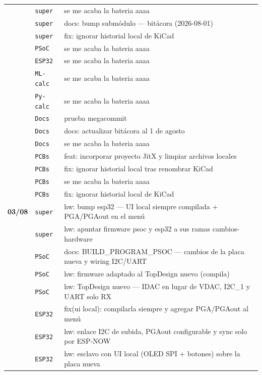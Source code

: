 \begin{longtable}{@{}p{1.7cm} p{1.5cm} p{12.2cm}@{}}
 & \texttt{\scriptsize super} & se me acaba la bateria aaaa \\
 & \texttt{\scriptsize super} & docs: bump submódulo --- bitácora (2026-08-01) \\
 & \texttt{\scriptsize super} & fix: ignorar historial local de KiCad \\
 & \texttt{\scriptsize PSoC} & se me acaba la bateria aaaa \\
 & \texttt{\scriptsize ESP32} & se me acaba la bateria aaaa \\
 & \texttt{\scriptsize ML-calc} & se me acaba la bateria aaaa \\
 & \texttt{\scriptsize Py-calc} & se me acaba la bateria aaaa \\
 & \texttt{\scriptsize Docs} & prueba megacommit \\
 & \texttt{\scriptsize Docs} & docs: actualizar bitácora al 1 de agosto \\
 & \texttt{\scriptsize Docs} & se me acaba la bateria aaaa \\
 & \texttt{\scriptsize PCBs} & feat: incorporar proyecto JitX y limpiar archivos locales \\
 & \texttt{\scriptsize PCBs} & fix: ignorar historial local tras renombrar KiCad \\
 & \texttt{\scriptsize PCBs} & se me acaba la bateria aaaa \\
 & \texttt{\scriptsize PCBs} & fix: ignorar historial local de KiCad \\
\textbf{03/08} & \texttt{\scriptsize super} & hw: bump esp32 --- UI local siempre compilada + PGA/PGAout en el menú \\
 & \texttt{\scriptsize super} & hw: apuntar firmware psoc y esp32 a sus ramas cambios-hardware \\
 & \texttt{\scriptsize PSoC} & docs: BUILD\_PROGRAM\_PSOC --- cambios de la placa nueva y wiring I2C/UART \\
 & \texttt{\scriptsize PSoC} & hw: firmware adaptado al TopDesign nuevo (compila) \\
 & \texttt{\scriptsize PSoC} & hw: TopDesign nuevo --- IDAC en lugar de VDAC, I2C\_1 y UART solo RX \\
 & \texttt{\scriptsize ESP32} & fix(ui local): compilarla siempre y agregar PGA/PGAout al menú \\
 & \texttt{\scriptsize ESP32} & hw: enlace I2C de subida, PGAout configurable y sync solo por ESP-NOW \\
 & \texttt{\scriptsize ESP32} & hw: esclavo con UI local (OLED SPI + botones) sobre la placa nueva \\
\end{longtable}
\normalsize
